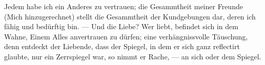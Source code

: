 Jedem habe ich ein Anderes zu vertrauen; die Gesammtheit meiner Freunde (Mich hinzugerechnet) stellt die Gesammtheit der Kundgebungen dar, deren ich fähig und bedürftig bin. — Und die Liebe? Wer liebt, befindet sich in dem Wahne, Einem Alles anvertrauen zu dürfen; eine verhängnissvolle Täuschung, denn entdeckt der Liebende, dass der Spiegel, in dem er sich ganz reflectirt glaubte, nur ein Zerrspiegel war, so nimmt er Rache, — an sich oder dem Spiegel.
\par

